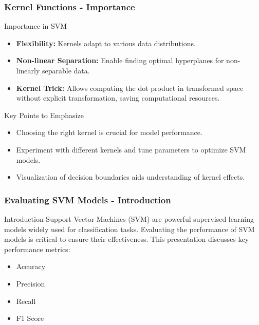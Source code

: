 \documentclass[aspectratio=169]{beamer}
\begin{document}
\begin{frame}[fragile]
    \frametitle{Kernel Functions - Importance}
    \begin{block}{Importance in SVM}
        \begin{itemize}
            \item \textbf{Flexibility:} Kernels adapt to various data distributions.
            \item \textbf{Non-linear Separation:} Enable finding optimal hyperplanes for non-linearly separable data.
            \item \textbf{Kernel Trick:} Allows computing the dot product in transformed space without explicit transformation, saving computational resources.
        \end{itemize}
    \end{block}
    
    \begin{block}{Key Points to Emphasize}
        \begin{itemize}
            \item Choosing the right kernel is crucial for model performance.
            \item Experiment with different kernels and tune parameters to optimize SVM models.
            \item Visualization of decision boundaries aids understanding of kernel effects.
        \end{itemize}
    \end{block}
\end{frame}

\begin{frame}[fragile]
    \frametitle{Evaluating SVM Models - Introduction}
    \begin{block}{Introduction}
        Support Vector Machines (SVM) are powerful supervised learning models widely used for classification tasks. Evaluating the performance of SVM models is critical to ensure their effectiveness. This presentation discusses key performance metrics:
        \begin{itemize}
            \item Accuracy
            \item Precision
            \item Recall
            \item F1 Score
        \end{itemize}
    \end{block}
\end{frame}
\end{document}
